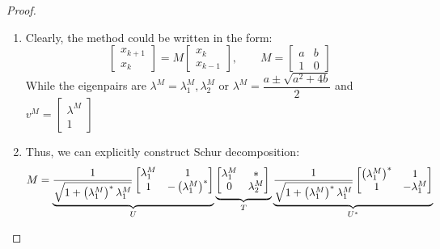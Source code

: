 \documentclass[a4paper,11pt]{article}
\begin{document}
\begin{proof}
\begin{enumerate}
 \item Clearly, the method could be written in the form:
 $$
 \begin{bmatrix} 
 x_{k+1} \\
 x_k 
 \end{bmatrix} = M \begin{bmatrix} 
 x_{k} \\
 x_{k-1}
 \end{bmatrix}, \qquad
 M = \begin{bmatrix} 
 a & b \\
 1 & 0
 \end{bmatrix}
 $$
 While the eigenpairs are $\lambda^M = \lambda^M_1, \lambda^M_2$ or $\lambda^M = \dfrac{a \pm \sqrt{a^2 + 4b}}{2}$ and $v^M = \begin{bmatrix} 
 \lambda^M \\
 1
 \end{bmatrix}$
 \item Thus, we can explicitly construct Schur decomposition:
 \begin{equation}
 M = 
 \underbrace{\dfrac{1}{\sqrt{1 + \left(\lambda^M_1\right)^*\lambda^M_1}}\begin{bmatrix} \lambda^M_1 & 1 \\ 1 & -\left(\lambda^M_1\right)^* \end{bmatrix} }_{U}
 \underbrace{\begin{bmatrix} \lambda^M_1 & * \\ 0 & \lambda^M_2 \end{bmatrix}\vphantom{\dfrac{1}{\sqrt{1 + \lambda^M_1\lambda^M_2}}}}_T
 \underbrace{\dfrac{1}{\sqrt{1 + \left(\lambda^M_1\right)^*\lambda^M_1}}\begin{bmatrix} \left(\lambda^M_1\right)^* & 1 \\ 1 & -\lambda^M_1 \end{bmatrix}}_{U^*}
 \end{equation}
    

\end{enumerate}
\end{proof}
\end{document}
